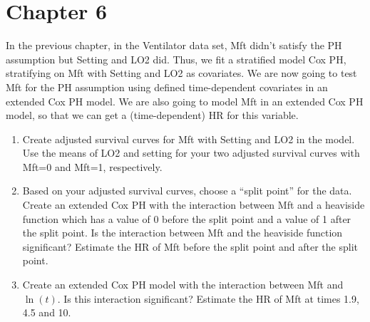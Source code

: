 \documentclass[12pt]{article}
\begin{document}
\section{Chapter 6}
In the previous chapter, in the Ventilator data set, Mft didn't satisfy the PH assumption but Setting and LO2 did. Thus, we fit a stratified model Cox PH, stratifying on Mft with Setting and LO2 as covariates. We are now going to test Mft for the PH assumption using defined time-dependent covariates in an extended Cox PH model. We are also going to model Mft  in an extended Cox PH model, so that we can get a (time-dependent) HR for this variable.
\begin{enumerate}
\item Create adjusted survival curves for Mft with Setting and LO2 in the model. Use the means of LO2 and setting for your two adjusted survival curves with Mft=0 and Mft=1, respectively.  
\item Based on your adjusted survival curves, choose a ``split point'' for the data. Create an extended Cox PH with the interaction between Mft and a heaviside function which has a value of 0 before the split point and a value of 1 after the split point. Is the interaction between Mft and the heaviside function significant? Estimate the HR of Mft before the split point and after the split point.
\item Create an extended Cox PH model with the interaction between Mft and $\ln(t)$. Is this interaction significant? Estimate the HR of Mft at times 1.9, 4.5 and 10.  

\end{enumerate} 
\end{document}
